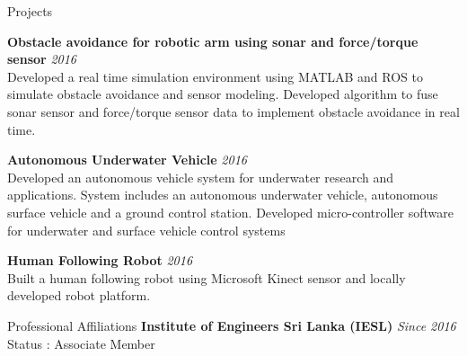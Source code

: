 \documentclass[
11pt, %
]{./assets/resume} %
\begin{document}
\begin{rSection}{Projects}

	\textbf{Obstacle avoidance for robotic arm using sonar and force/torque sensor} \hfill \textit{2016}\\
	Developed a real time simulation environment using MATLAB and ROS to simulate obstacle avoidance and sensor modeling.
    Developed algorithm to fuse sonar sensor and force/torque sensor data to implement obstacle avoidance in real time.

	
	\textbf{Autonomous Underwater Vehicle} \hfill \textit{2016}\\
	Developed an autonomous vehicle system for underwater research and applications. System includes an autonomous underwater vehicle, autonomous surface vehicle and a ground control station.
    Developed micro-controller software for underwater and surface vehicle control systems

	\textbf{Human Following Robot } \hfill \textit{2016}\\
	Built a human following robot using Microsoft Kinect sensor and locally developed robot platform.

\end{rSection}

\begin{rSection}{Professional Affiliations}
	\textbf{Institute of Engineers Sri Lanka (IESL)} \hfill \textit{Since 2016}\\
	Status : Associate Member
	
\end{rSection}



\end{document}
